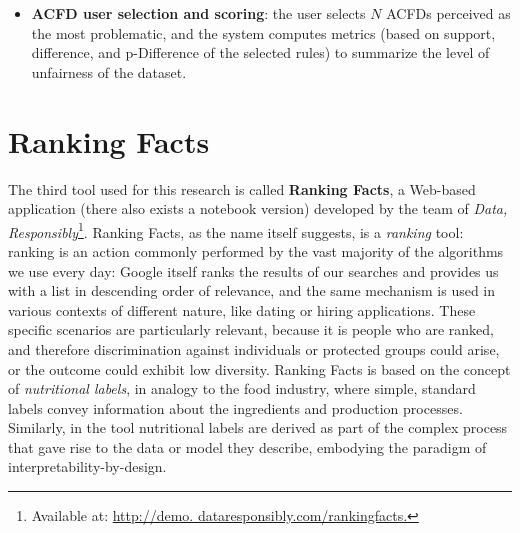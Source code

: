 \begin{itemize}
\item \textbf{ACFD user selection and scoring}: the user selects \(N\) ACFDs perceived as the most problematic, and the system computes metrics (based on support, difference, and p-Difference of the selected rules) to summarize the level of unfairness of the dataset.
\end{itemize}


\section{Ranking Facts}
\label{section:ranking_facts}
The third tool used for this research is called \textbf{Ranking Facts}, a Web-based application (there also exists a notebook version) developed by the team of \textit{Data, Responsibly}\footnote{Available at: \url{http://demo. dataresponsibly.com/rankingfacts.}}. Ranking Facts, as the name itself suggests, is a \textit{ranking} tool: ranking is an action commonly performed by the vast majority of the algorithms we use every day: Google itself ranks the results of our searches and provides us with a list in descending order of relevance, and the same mechanism is used in various contexts of different nature, like dating or hiring applications. These specific scenarios are particularly relevant, because it is people who are ranked, and therefore discrimination against individuals or protected groups could arise, or the outcome could exhibit low diversity. Ranking Facts is based on the concept of \textit{nutritional labels}, in analogy to the food industry, where simple, standard labels convey information about the ingredients and production processes. Similarly, in the tool nutritional labels are derived as part of the complex process that gave rise to the data or model they describe, embodying the paradigm of interpretability-by-design.

